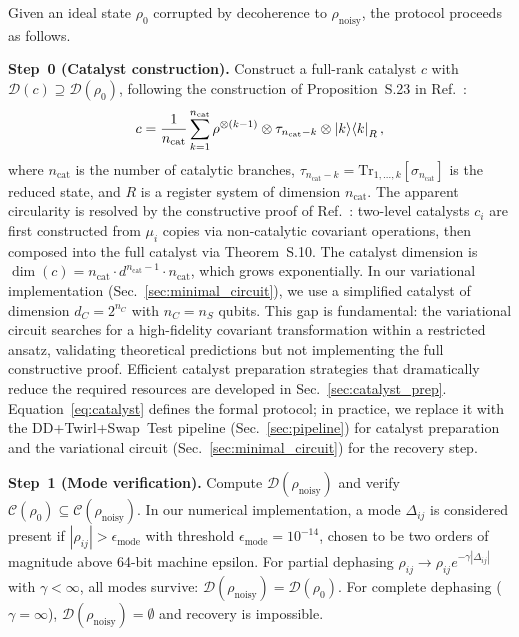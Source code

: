 \documentclass[pra,twocolumn,superscriptaddress,longbibliography,floatfix]{revtex4-2}
\begin{document}
Given an ideal state $\rho_0$ corrupted by decoherence to $\rho_\mathrm{noisy}$, the protocol proceeds as follows.

\textbf{Step~0 (Catalyst construction).}
Construct a full-rank catalyst $c$ with $\mathcal{D}(c) \supseteq \mathcal{D}(\rho_0)$, following the construction of Proposition~S.23 in Ref.~\cite{Shiraishi2024}:
\begin{equation}
c = \frac{1}{n_\mathrm{cat}} \sum_{k=1}^{n_\mathrm{cat}} \rho^{\otimes(k-1)} \otimes \tau_{n_\mathrm{cat}-k} \otimes \ket{k}\!\bra{k}_R,
\label{eq:catalyst}
\end{equation}
where $n_\mathrm{cat}$ is the number of catalytic branches, $\tau_{n_\mathrm{cat}-k} = \mathrm{Tr}_{1,\ldots,k}[\sigma_{n_\mathrm{cat}}]$ is the reduced state, and $R$ is a register system of dimension $n_\mathrm{cat}$.
The apparent circularity is resolved by the constructive proof of Ref.~\cite{Shiraishi2024}: two-level catalysts $c_i$ are first constructed from $\mu_i$ copies via non-catalytic covariant operations, then composed into the full catalyst via Theorem~S.10.
The catalyst dimension is $\dim(c) = n_\mathrm{cat} \cdot d^{n_\mathrm{cat}-1} \cdot n_\mathrm{cat}$, which grows exponentially.
In our variational implementation (Sec.~\ref{sec:minimal_circuit}), we use a simplified catalyst of dimension $d_C = 2^{n_C}$ with $n_C = n_S$ qubits.
This gap is fundamental: the variational circuit searches for a high-fidelity covariant transformation within a restricted ansatz, validating theoretical predictions but not implementing the full constructive proof.
Efficient catalyst preparation strategies that dramatically reduce the required resources are developed in Sec.~\ref{sec:catalyst_prep}.
Equation~\eqref{eq:catalyst} defines the formal protocol; in practice, we replace it with the DD+Twirl+Swap~Test pipeline (Sec.~\ref{sec:pipeline}) for catalyst preparation and the variational circuit (Sec.~\ref{sec:minimal_circuit}) for the recovery step.

\textbf{Step~1 (Mode verification).}
Compute $\mathcal{D}(\rho_\mathrm{noisy})$ and verify $\mathcal{C}(\rho_0) \subseteq \mathcal{C}(\rho_\mathrm{noisy})$.
In our numerical implementation, a mode $\Delta_{ij}$ is considered present if $|\rho_{ij}| > \epsilon_\mathrm{mode}$ with threshold $\epsilon_\mathrm{mode} = 10^{-14}$, chosen to be two orders of magnitude above 64-bit machine epsilon.
For partial dephasing $\rho_{ij} \to \rho_{ij} e^{-\gamma|\Delta_{ij}|}$ with $\gamma < \infty$, all modes survive: $\mathcal{D}(\rho_\mathrm{noisy}) = \mathcal{D}(\rho_0)$.
For complete dephasing ($\gamma = \infty$), $\mathcal{D}(\rho_\mathrm{noisy}) = \emptyset$ and recovery is impossible.
\end{document}
